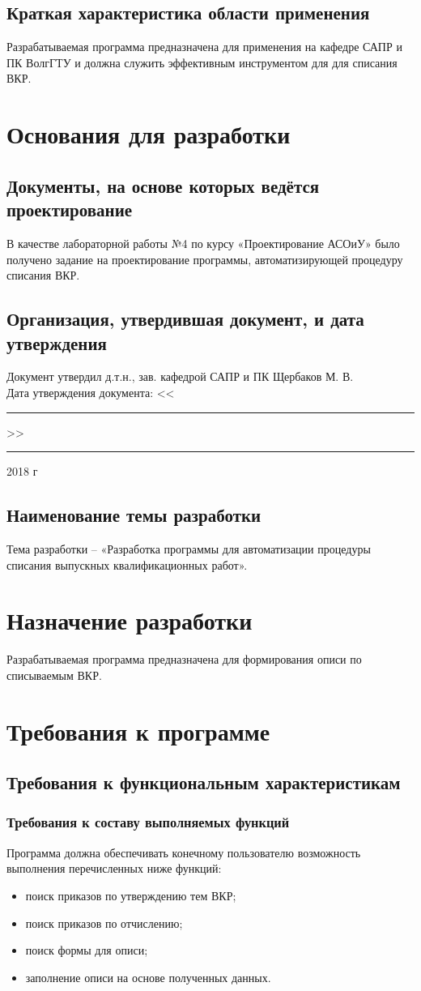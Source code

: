 \documentclass[14pt, a4paper]{extarticle}
\begin{document}
	\subsection{Краткая характеристика области применения}
	Разрабатываемая программа предназначена для применения на кафедре САПР и ПК ВолгГТУ и должна служить эффективным инструментом для для списания ВКР.
	
	\section{Основания для разработки}
	\subsection{Документы, на основе которых ведётся проектирование}
	В качестве лабораторной работы №4 по курсу «Проектирование АСОиУ» было получено задание на проектирование программы, автоматизирующей процедуру списания ВКР.
	\subsection{Организация, утвердившая документ, и дата утверждения}
	Документ утвердил д.т.н., зав. кафедрой САПР и ПК Щербаков М. В.\\
	Дата утверждения документа: <<\rule{7mm}{0.4pt}>> \rule{35mm}{0.4pt} 2018 г
	\subsection{Наименование темы разработки}
	Тема разработки – «Разработка программы для автоматизации процедуры списания выпускных квалификационных работ».
	
	\section{Назначение разработки}
	Разрабатываемая программа предназначена для формирования описи по списываемым ВКР.
	
	\section{Требования к программе}
	\subsection{Требования к функциональным характеристикам}
	\subsubsection{Требования к составу выполняемых функций}
	Программа должна обеспечивать конечному пользователю возможность выполнения перечисленных ниже функций:
	\begin{itemize}
		\item поиск приказов по утверждению тем ВКР;
		\item поиск приказов по отчислению;
		\item поиск формы для описи;
		\item заполнение описи на основе полученных данных.
	\end{itemize}
	
\end{document}
